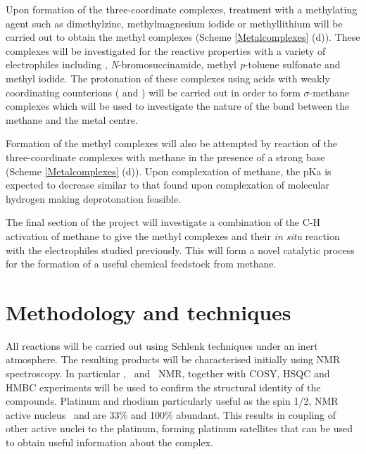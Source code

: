 Upon formation of the three-coordinate complexes, treatment with a methylating agent such as dimethylzinc, methylmagnesium iodide or methyllithium will be carried out to obtain the methyl complexes (Scheme \ref{Metalcomplexes} (d)).  These complexes will be investigated for the reactive properties with a variety of electrophiles including , \emph{N}-bromosuccinamide, methyl \emph{p}-toluene sulfonate and methyl iodide.  The protonation of these complexes using acids with weakly coordinating counterions ( and ) will be carried out in order to form $\sigma$-methane complexes which will be used to investigate the nature of the bond between the methane and the metal centre.  

Formation of the methyl complexes will also be attempted by reaction of the three-coordinate complexes with methane in the presence of a strong base (Scheme \ref{Metalcomplexes} (d)).  Upon complexation of methane, the pKa is expected to decrease similar to that found upon complexation of molecular hydrogen making deprotonation feasible.\cite{Crabtree1995}


The final section of the project will investigate a combination of the C-H activation of methane to give the methyl complexes and their \emph{in situ} reaction with the electrophiles studied previously.  This will form a novel catalytic process for the formation of a useful chemical feedstock from methane.  

\section{Methodology and techniques}

All reactions will be carried out using Schlenk techniques under an inert atmosphere.  The resulting products will be characterised initially using NMR spectroscopy.  In particular \proton, \carbon~and \phosphorus~NMR, together with COSY, HSQC and HMBC experiments will be used to confirm the structural identity of the compounds.  Platinum and rhodium particularly useful as the spin 1/2, NMR active nucleus \Pt~and  are 33\% and 100\% abundant.  This results in coupling of other active nuclei to the platinum, forming platinum satellites that can be used to obtain useful information about the complex.

